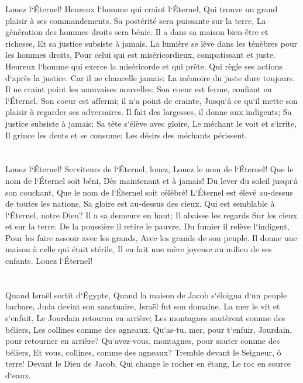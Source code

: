 \verse Louez l`Éternel! Heureux l`homme qui craint l`Éternel, Qui trouve un grand plaisir à ses commandements. 
\verse Sa postérité sera puissante sur la terre, La génération des hommes droits sera bénie. 
\verse Il a dans sa maison bien-être et richesse, Et sa justice subsiste à jamais. 
\verse La lumière se lève dans les ténèbres pour les hommes droits, Pour celui qui est miséricordieux, compatissant et juste. 
\verse Heureux l`homme qui exerce la miséricorde et qui prête. Qui règle ses actions d`après la justice. 
\verse Car il ne chancelle jamais; La mémoire du juste dure toujours. 
\verse Il ne craint point les mauvaises nouvelles; Son coeur est ferme, confiant en l`Éternel. 
\verse Son coeur est affermi; il n`a point de crainte, Jusqu`à ce qu`il mette son plaisir à regarder ses adversaires. 
\verse Il fait des largesses, il donne aux indigents; Sa justice subsiste à jamais; Sa tête s`élève avec gloire, 
\verse Le méchant le voit et s`irrite, Il grince les dents et se consume; Les désirs des méchants périssent. 

\chapter{}

\verse Louez l`Éternel! Serviteurs de l`Éternel, louez, Louez le nom de l`Éternel! 
\verse Que le nom de l`Éternel soit béni, Dès maintenant et à jamais! 
\verse Du lever du soleil jusqu`à son couchant, Que le nom de l`Éternel soit célébré! 
\verse L`Éternel est élevé au-dessus de toutes les nations, Sa gloire est au-dessus des cieux. 
\verse Qui est semblable à l`Éternel, notre Dieu? Il a sa demeure en haut; 
\verse Il abaisse les regards Sur les cieux et sur la terre. 
\verse De la poussière il retire le pauvre, Du fumier il relève l`indigent, 
\verse Pour les faire asseoir avec les grands, Avec les grands de son peuple. 
\verse Il donne une maison à celle qui était stérile, Il en fait une mère joyeuse au milieu de ses enfants. Louez l`Éternel! 

\chapter{}

\verse Quand Israël sortit d`Égypte, Quand la maison de Jacob s`éloigna d`un peuple barbare, 
\verse Juda devint son sanctuaire, Israël fut son domaine. 
\verse La mer le vit et s`enfuit, Le Jourdain retourna en arrière; 
\verse Les montagnes sautèrent comme des béliers, Les collines comme des agneaux. 
\verse Qu`as-tu, mer, pour t`enfuir, Jourdain, pour retourner en arrière? 
\verse Qu`avez-vous, montagnes, pour sauter comme des béliers, Et vous, collines, comme des agneaux? 
\verse Tremble devant le Seigneur, ô terre! Devant le Dieu de Jacob, 
\verse Qui change le rocher en étang, Le roc en source d`eaux. 

